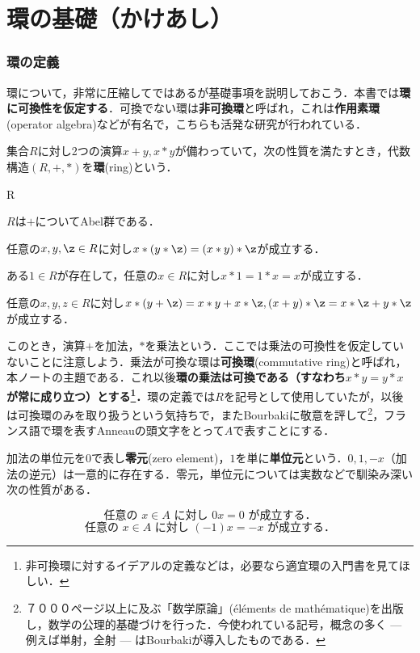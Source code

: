 \setcounter{part}{-1}
\part[Definition of Ring and more...]{環の基礎（かけあし）}
\section{環の定義}

環について，非常に圧縮してではあるが基礎事項を説明しておこう．本書では\textbf{環に可換性を仮定する}．可換でない環は\textbf{非可換環}と呼ばれ，これは\textbf{作用素環}(operator algebra)などが有名で，こちらも活発な研究が行われている．
\begin{defi}[環]
	集合$R$に対し2つの演算$x+y,x*y$が備わっていて，次の性質を満たすとき，代数構造$(R,+,*)$を\textbf{環}(ring)という．
	\begin{defiterm}{R}
		\item $R$は$+$についてAbel群である．
		\item 任意の$x,y,\z\in R$に対し$x*(y*\z)=(x*y)*\z$が成立する．
		\item ある$1\in R$が存在して，任意の$x\in R$に対し$x*1=1*x=x$が成立する．
		\item 任意の$x,y,z\in R$に対し$x*(y+\z)=x*y+x*\z,(x+y)*\z=x*\z+y*\z$が成立する．
	\end{defiterm}
\end{defi}

このとき，演算$+$を加法，$*$を乗法という．ここでは乗法の可換性を仮定していないことに注意しよう．乗法が可換な環は\textbf{可換環}(commutative ring)と呼ばれ，本ノートの主題である．これ以後\textbf{環の乗法は可換である（すなわち$x*y=y*x$が常に成り立つ）とする\footnote{非可換環に対するイデアルの定義などは，必要なら適宜環の入門書を見てほしい．}．}環の定義では$R$を記号として使用していたが，以後は可換環のみを取り扱うという気持ちで，またBourbakiに敬意を評して\footnote{７０００ページ以上に及ぶ「数学原論」(\'el\'ements de math\'ematique)を出版し，数学の公理的基礎づけを行った．今使われている記号，概念の多く --- 例えば単射，全射 --- はBourbakiが導入したものである．}，フランス語で環を表すAnneauの頭文字をとって$A$で表すことにする．

加法の単位元を$0$で表し\textbf{零元}(zero element)，$1$を単に\textbf{単位元}という．$0,1,-x$（加法の逆元）は一意的に存在する．零元，単位元については実数などで馴染み深い次の性質がある．

\[\text{任意の }x\in A\text{ に対し }0x=0\text{ が成立する．}\]
\[\text{任意の }x\in A\text{ に対し }(-1)x=-x\text{ が成立する．}\]

